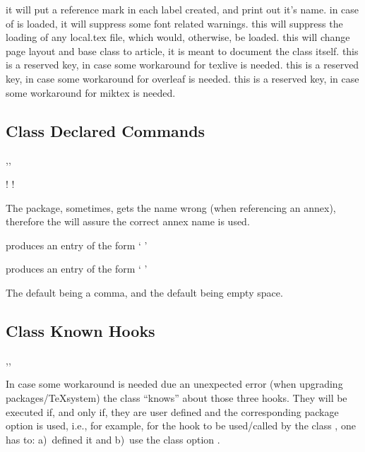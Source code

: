 \documentclass[dctools,english]{ufrgscca} %
\begin{document}
\begin{Options}
	 it will put a reference mark in each label created, and print out it's name.
	 in case of  is loaded, it will suppress some font related warnings.
	 this will suppress the loading of any local.tex file, which would, otherwise, be loaded.
	 this will change page layout and base class to article, it is meant to document the class itself.
	 this is a reserved key, in case some workaround for texlive is needed.
	 this is a reserved key, in case some workaround for overleaf is needed.
	 this is a reserved key, in case some workaround for miktex is needed.
\end{Options}

\subsection{Class Declared Commands}
\begin{Macros}{\autonameref,\annexref,\autoannexref}
	\begin{Syntax}%
		\Macro!{\autonameref}{}
		\Macro!{\autoannexref}{}
	\end{Syntax}
The  package, sometimes, gets the \Macro{\autoref}{} name wrong (when referencing an annex), therefore the  will assure the correct annex name is used.

 produces an entry of the form `   '

 produces an entry of the form `   '

The default  being a comma, and the default  being empty space.

\end{Macros}

\subsection{Class Known Hooks}
\begin{Macros}{\miktexHack,\overleafHack,\livetexHack}
    \begin{Syntax}%
        \Macro{\miktexHack}{}
        \Macro{\overleafHack}{}
        \Macro{\livetexHack}{}
    \end{Syntax}
    In case some workaround is needed due an unexpected error (when upgrading packages/\TeX system) the class “knows” about those three hooks.
    They will be executed if, and only if, they are user defined and the corresponding package option is used, i.e., for example, for the hook \Macro{\miktexHack}{} to be used/called by the class , one has to: a)~defined it and b)~use the class option .
\end{Macros}
\end{document}
